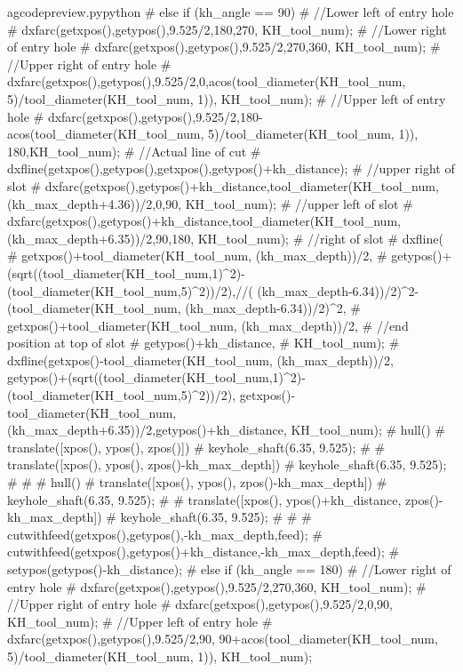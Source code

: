 \documentclass{ltxdoc}
\begin{document}
\begin{writecode}{a}{gcodepreview.py}{python}
{#  } else if (kh_angle == 90) {
#    //Lower left of entry hole
#    dxfarc(getxpos(),getypos(),9.525/2,180,270, KH_tool_num);
#    //Lower right of entry hole
#    dxfarc(getxpos(),getypos(),9.525/2,270,360, KH_tool_num);
#    //Upper right of entry hole
#    dxfarc(getxpos(),getypos(),9.525/2,0,acos(tool_diameter(KH_tool_num, 5)/tool_diameter(KH_tool_num, 1)), KH_tool_num);
#    //Upper left of entry hole
#    dxfarc(getxpos(),getypos(),9.525/2,180-acos(tool_diameter(KH_tool_num, 5)/tool_diameter(KH_tool_num, 1)), 180,KH_tool_num);
#    //Actual line of cut
#    dxfline(getxpos(),getypos(),getxpos(),getypos()+kh_distance);
#    //upper right of slot
#    dxfarc(getxpos(),getypos()+kh_distance,tool_diameter(KH_tool_num, (kh_max_depth+4.36))/2,0,90, KH_tool_num);
#    //upper left of slot
#    dxfarc(getxpos(),getypos()+kh_distance,tool_diameter(KH_tool_num, (kh_max_depth+6.35))/2,90,180, KH_tool_num);
#    //right of slot
#    dxfline(
#        getxpos()+tool_diameter(KH_tool_num, (kh_max_depth))/2, 
#        getypos()+(sqrt((tool_diameter(KH_tool_num,1)^2)-(tool_diameter(KH_tool_num,5)^2))/2),//( (kh_max_depth-6.34))/2)^2-(tool_diameter(KH_tool_num, (kh_max_depth-6.34))/2)^2,
#        getxpos()+tool_diameter(KH_tool_num, (kh_max_depth))/2,
#    //end position at top of slot
#        getypos()+kh_distance, 
#        KH_tool_num);
#    dxfline(getxpos()-tool_diameter(KH_tool_num, (kh_max_depth))/2, getypos()+(sqrt((tool_diameter(KH_tool_num,1)^2)-(tool_diameter(KH_tool_num,5)^2))/2), getxpos()-tool_diameter(KH_tool_num, (kh_max_depth+6.35))/2,getypos()+kh_distance, KH_tool_num);
#    hull(){
#      translate([xpos(), ypos(), zpos()]){
#        keyhole_shaft(6.35, 9.525);
#      }
#      translate([xpos(), ypos(), zpos()-kh_max_depth]){
#        keyhole_shaft(6.35, 9.525);
#      }
#    }
#    hull(){
#      translate([xpos(), ypos(), zpos()-kh_max_depth]){
#        keyhole_shaft(6.35, 9.525);
#      }
#      translate([xpos(), ypos()+kh_distance, zpos()-kh_max_depth]){
#        keyhole_shaft(6.35, 9.525);
#      }
#    }
#    cutwithfeed(getxpos(),getypos(),-kh_max_depth,feed);
#    cutwithfeed(getxpos(),getypos()+kh_distance,-kh_max_depth,feed);
#    setypos(getypos()-kh_distance);
#  } else if (kh_angle == 180) {
#    //Lower right of entry hole
#    dxfarc(getxpos(),getypos(),9.525/2,270,360, KH_tool_num);
#    //Upper right of entry hole
#    dxfarc(getxpos(),getypos(),9.525/2,0,90, KH_tool_num);
#    //Upper left of entry hole
#    dxfarc(getxpos(),getypos(),9.525/2,90, 90+acos(tool_diameter(KH_tool_num, 5)/tool_diameter(KH_tool_num, 1)), KH_tool_num);
}
\end{writecode}
\end{document}
